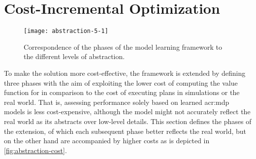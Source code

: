 

\section{Cost-Incremental Optimization}
\label{sec:cost-effective-optimization}

\begin{figure}[t]
	\centering
	\texttt{[image: abstraction-5-1]}
	\caption{Correspondence of the phases of the model learning framework to the different levels of abstraction.}
	\label{fig:abstraction-cost}
\end{figure}

To make the solution more cost-effective, the framework is extended by defining three phases with the aim of exploiting the lower cost of computing the value function for  in comparison to the cost of executing plans in simulations or the real world.
That is, assessing performance solely based on learned \acrshort{acr:mdp} models is less cost-expensive, although the model might not accurately reflect the real world as its abstracts over low-level details.
This section defines the phases of the extension, of which each subsequent phase better reflects the real world, but on the other hand are accompanied by higher costs as is depicted in \autoref{fig:abstraction-cost}.



